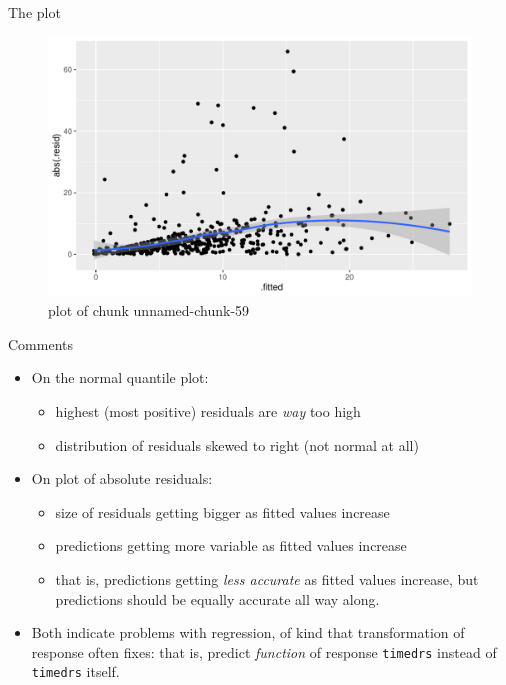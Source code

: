\documentclass[ignorenonframetext,]{beamer}
\begin{document}
\begin{frame}{The plot}
\protect\hypertarget{the-plot}{}

\begin{figure}
\centering
\includegraphics{figure/unnamed-chunk-59-1.pdf}
\caption{plot of chunk unnamed-chunk-59}
\end{figure}

\end{frame}

\begin{frame}[fragile]{Comments}
\protect\hypertarget{comments-4}{}

\begin{itemize}
\item
  On the normal quantile plot:

  \begin{itemize}
  \item
    highest (most positive) residuals are \emph{way} too high
  \item
    distribution of residuals skewed to right (not normal at all)
  \end{itemize}
\item
  On plot of absolute residuals:

  \begin{itemize}
  \item
    size of residuals getting bigger as fitted values increase
  \item
    predictions getting more variable as fitted values increase
  \item
    that is, predictions getting \emph{less accurate} as fitted values
    increase, but predictions should be equally accurate all way along.
  \end{itemize}
\item
  Both indicate problems with regression, of kind that transformation of
  response often fixes: that is, predict \emph{function} of response
  \texttt{timedrs} instead of \texttt{timedrs} itself.
\end{itemize}

\end{frame}
\end{document}
